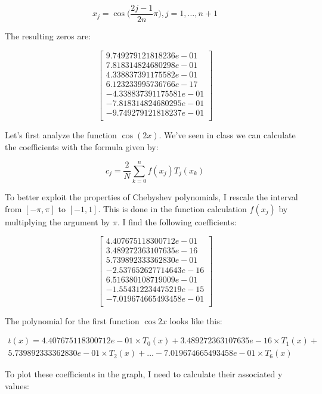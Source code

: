 \documentclass{article}
\begin{document}
$$x_j=\cos \Big( \frac{2j-1}{2n}\pi \Big), j=1,\dots,n+1$$

The resulting zeros are:

$$
\begin{bmatrix} 
9.749279121818236e-01\\
7.818314824680298e-01\\
4.338837391175582e-01\\
6.123233995736766e-17\\
-4.338837391175581e-01\\
-7.818314824680295e-01\\
-9.749279121818237e-01\\
\end{bmatrix}
$$

Let's first analyze the function $\cos(2x)$. We've seen in class we can calculate the coefficients with the formula given by:

$$c_j=\frac{2}{N}\sum_{k=0}^{n}f(x_j)T_j(x_k)$$

To better exploit the properties of Chebyshev polynomials, I rescale the interval from $[-\pi,\pi]$ to $[-1,1]$. This is done in the function calculation $f(x_j)$ by multiplying the argument by $\pi$. I find the following coefficients:

$$
\begin{bmatrix} 
4.407675118300712e-01\\
3.489272363107635e-16\\
5.739892333362830e-01\\
-2.537652627714643e-16\\
6.516380108719009e-01\\
-1.554312234475219e-15\\
-7.019674665493458e-01\\
\end{bmatrix}
$$

The polynomial for the first function $\cos{2x}$ looks like this:

\begin{equation}
  \begin{array}{l}
    t(x) = 4.407675118300712e-01 \times T_0(x)+ 3.489272363107635e-16 \times T_1(x) + \\ 
    5.739892333362830e-01 \times T_2(x) + \dots -7.019674665493458e-01 \times T_6(x)
  \end{array}
\end{equation}

To plot these coefficients in the graph, I need to calculate their associated y values:
\end{document}
